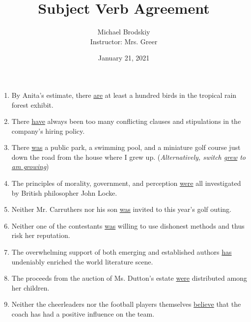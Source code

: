 \documentclass[12pt]{article}
\title{Subject Verb Agreement}
\date{January 21, 2021}
\author{Michael Brodskiy\\ \small Instructor: Mrs. Greer}
\begin{document}
    \maketitle

    \begin{enumerate}

        \begin{center}
          Fix the verb(s) where necessary:
        \end{center}

      \item By Anita's estimate, there  \underline{are} at least a hundred birds in the tropical rain forest exhibit.

      \item There  \underline{have} always been too many conflicting clauses and stipulations in the company's hiring policy.

      \item There  \underline{was} a public park, a swimming pool, and a miniature golf course just down the road from the house where I grew up. (\textit{Alternatively, switch \underline{grew} to \underline{am growing}})

      \item The principles of morality, government, and perception  \underline{were} all investigated by British philosopher John Locke.

      \item Neither Mr. Carruthers nor his son  \underline{was} invited to this year's golf outing.

      \item Neither one of the contestants  \underline{was} willing to use dishonest methods and thus risk her reputation.

      \item The overwhelming support of both emerging and established authors  \underline{has} undeniably enriched the world literature scene.

      \item The proceeds from the auction of Ms. Dutton's estate  \underline{were} distributed among her children.

      \item Neither the cheerleaders nor the football players themselves  \underline{believe} that the coach has had a positive influence on the team.


\end{enumerate}
\end{document}
